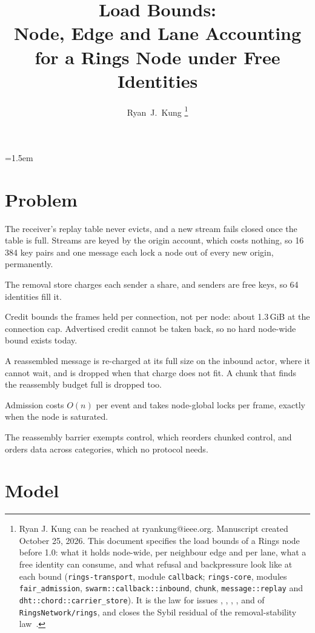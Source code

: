 \documentclass[journal]{IEEEtran}
\author{Ryan~J.~Kung%
\thanks{Ryan J. Kung can be reached at ryankung@ieee.org.
Manuscript created October 25, 2026.  This document specifies the load bounds of a Rings node
before 1.0: what it holds node-wide, per neighbour edge and per lane, what a free identity can
consume, and what refusal and backpressure look like at each bound (\texttt{rings-transport},
module \texttt{callback}; \texttt{rings-core}, modules \texttt{fair\_admission},
\texttt{swarm::callback::inbound}, \texttt{chunk}, \texttt{message::replay} and
\texttt{dht::chord::carrier\_store}).  It is the law for issues \issue{907}, \issue{927},
\issue{932}, \issue{934}, \issue{938} and \issue{1094} of \texttt{RingsNetwork/rings}, and closes
the Sybil residual of the removal-stability law~\cite{RemovalStability}.}}
\title{\huge Load Bounds:\\
Node, Edge and Lane Accounting\\
for a Rings Node under Free Identities}
\date{}
\newcommand{\issue}[1]{\#{#1}}
\begin{document}
\maketitle
\emergencystretch=1.5em

\section{Problem}\label{sec:problem}

\begin{description}[leftmargin=1.2em,style=nextline]
\item[\issue{907}] The receiver's replay table never evicts, and a new stream fails closed once
the table is full.  Streams are keyed by the origin account, which costs nothing, so 16\,384 key
pairs and one message each lock a node out of every new origin, permanently.
\item[\issue{1060}, residual] The removal store charges each sender a share, and senders are
free keys, so 64 identities fill it.
\item[\issue{934}] Credit bounds the frames held per connection, not per node: about 1.3\,GiB
at the connection cap.  Advertised credit cannot be taken back, so no hard node-wide bound
exists today.
\item[\issue{932}] A reassembled message is re-charged at its full size on the inbound actor,
where it cannot wait, and is dropped when that charge does not fit.  A chunk that finds the
reassembly budget full is dropped too.
\item[\issue{938}] Admission costs $O(n)$ per event and takes node-global locks per frame,
exactly when the node is saturated.
\item[\issue{927}] The reassembly barrier exempts control, which reorders chunked control, and
orders data across categories, which no protocol needs.
\end{description}

\section{Model}\label{sec:model}
\end{document}

